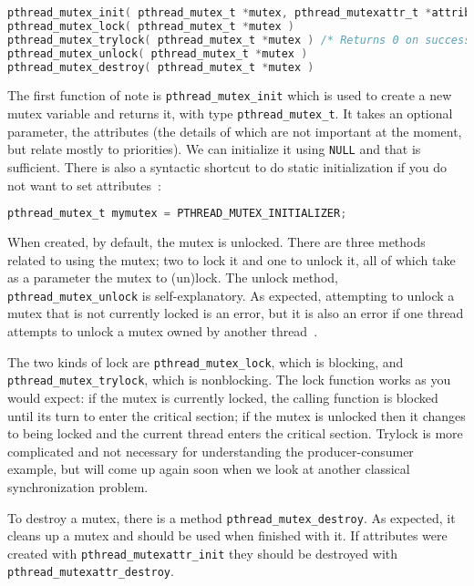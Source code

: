 \begin{lstlisting}[language=C]
pthread_mutex_init( pthread_mutex_t *mutex, pthread_mutexattr_t *attributes )
pthread_mutex_lock( pthread_mutex_t *mutex )
pthread_mutex_trylock( pthread_mutex_t *mutex ) /* Returns 0 on success */
pthread_mutex_unlock( pthread_mutex_t *mutex )
pthread_mutex_destroy( pthread_mutex_t *mutex )
\end{lstlisting}

The first function of note is \texttt{pthread\_mutex\_init} which is used to create a new mutex variable and returns it, with type \texttt{pthread\_mutex\_t}. It takes an optional parameter, the attributes (the details of which are not important at the moment, but relate mostly to priorities). We can initialize it using \texttt{NULL} and that is sufficient. There is also a syntactic shortcut to do static initialization if you do not want to set attributes~\cite{pthreads}: 

\begin{lstlisting}[language=C]
pthread_mutex_t mymutex = PTHREAD_MUTEX_INITIALIZER;
\end{lstlisting}

When created, by default, the mutex is unlocked. There are three methods related to using the mutex; two to lock it and one to unlock it, all of which take as a parameter the mutex to (un)lock. The unlock method, \texttt{pthread\_mutex\_unlock} is self-explanatory. As expected, attempting to unlock a mutex that is not currently locked is an error, but it is also an error if one thread attempts to unlock a mutex owned by another thread~\cite{pthreads}.

The two kinds of lock are \texttt{pthread\_mutex\_lock}, which is blocking, and \texttt{pthread\_mutex\_trylock}, which is nonblocking. The lock function works as you would expect: if the mutex is currently locked, the calling function is blocked until its turn to enter the critical section; if the mutex is unlocked then it changes to being locked and the current thread enters the critical section. Trylock is more complicated and not necessary for understanding the producer-consumer example, but will come up again soon when we look at another classical synchronization problem.

To destroy a mutex, there is a method \texttt{pthread\_mutex\_destroy}. As expected, it cleans up a mutex and should be used when finished with it. If attributes were created with \texttt{pthread\_mutexattr\_init} they should be destroyed with \texttt{pthread\_mutexattr\_destroy}.


